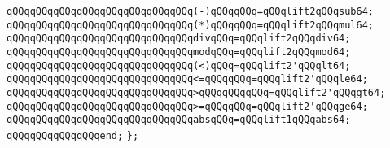 \verb|qQQqqQQqqQQqqQQqqQQqqQQqqQQqqQQq(-)qQQqqQQq=qQQqlift2qQQqsub64;|\newline
\verb|qQQqqQQqqQQqqQQqqQQqqQQqqQQqqQQq(*)qQQqqQQq=qQQqlift2qQQqmul64;|\newline
\newline
\verb|qQQqqQQqqQQqqQQqqQQqqQQqqQQqqQQqdivqQQq=qQQqlift2qQQqdiv64;|\newline
\verb|qQQqqQQqqQQqqQQqqQQqqQQqqQQqqQQqmodqQQq=qQQqlift2qQQqmod64;|\newline
\newline
\verb|qQQqqQQqqQQqqQQqqQQqqQQqqQQqqQQq(<)qQQq=qQQqlift2'qQQqlt64;|\newline
\verb|qQQqqQQqqQQqqQQqqQQqqQQqqQQqqQQq<=qQQqqQQq=qQQqlift2'qQQqle64;|\newline
\verb|qQQqqQQqqQQqqQQqqQQqqQQqqQQqqQQq>qQQqqQQqqQQq=qQQqlift2'qQQqgt64;|\newline
\verb|qQQqqQQqqQQqqQQqqQQqqQQqqQQqqQQq>=qQQqqQQq=qQQqlift2'qQQqge64;|\newline
\verb|qQQqqQQqqQQqqQQqqQQqqQQqqQQqqQQqabsqQQq=qQQqlift1qQQqabs64;|\newline
\verb|qQQqqQQqqQQqqQQqend;|\newline
\verb|};|\newline
\newline

